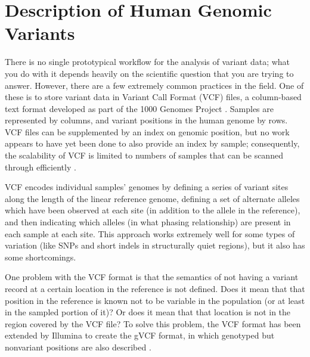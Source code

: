 \documentclass[11pt,proposal]{ucthesis}
\begin{document}

    
    
    
\section{Description of Human Genomic Variants}

There is no single prototypical workflow for the analysis of variant data; what you do with it depends heavily on the scientific question that you are trying to answer. However, there are a few extremely common practices in the field. One of these is to store variant data in Variant Call Format (VCF) files, a column-based text format developed as part of the 1000 Genomes Project \cite{danecek2011variant}. Samples are represented by columns, and variant positions in the human genome by rows. VCF files can be supplemented by an index on genomic position, but no work appears to have yet been done to also provide an index by sample; consequently, the scalability of VCF is limited to numbers of samples that can be scanned through efficiently \cite{danecek2011variant}.

VCF encodes individual samples' genomes by defining a series of variant sites along the length of the linear reference genome, defining a set of alternate alleles which have been observed at each site (in addition to the allele in the reference), and then indicating which alleles (in what phasing relationship) are present in each sample at each site. This approach works extremely well for some types of variation (like SNPs and short indels in structurally quiet regions), but it also has some shortcomings.

One problem with the VCF format is that the semantics of not having a variant record at a certain location in the reference is not defined. Does it mean that that position in the reference is known not to be variable in the population (or at least in the sampled portion of it)? Or does it mean that that location is not in the region covered by the VCF file? To solve this problem, the VCF format has been extended by Illumina to create the gVCF format, in which genotyped but nonvariant positions are also described \cite{saunders2014about}.
\end{document}
